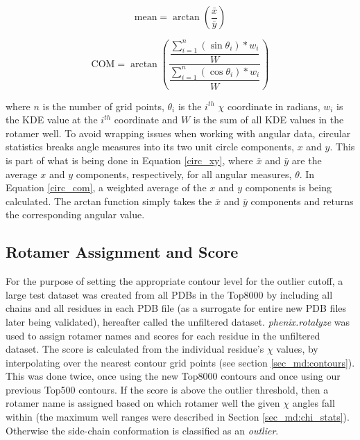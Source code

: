 \begin{equation}
\textrm{mean} = \arctan\left (
\frac{\bar{x}}{\bar{y}}
\right )
\label{circ_m}
\end{equation}

\begin{equation}
\textrm{COM} = \arctan\left (
  \dfrac{
    \dfrac{\sum_{i=1}^{n}\left ( \sin \theta_{i} \right )\ast w_{i}}{W}
  }{
    \dfrac{\sum_{i=1}^{n} \left ( \cos \theta_{i} \right )\ast w_{i}}{W}
  }
\right )
\label{circ_com}
\end{equation}

\noindent where $n$ is the number of grid points, $\theta_{i}$ is the $i^{th}$ $\chi$ coordinate in radians, $w_{i}$ is the KDE value at the $i^{th}$ coordinate and $W$ is the sum of all KDE values in the rotamer well. To avoid wrapping issues when working with angular data, circular statistics breaks angle measures into its two unit circle components, $x$ and $y$. This is part of what is being done in Equation \ref{circ_xy}, where $\bar{x}$ and $\bar{y}$ are the average $x$ and $y$ components, respectively, for all angular measures, $\theta$. In Equation \ref{circ_com}, a weighted average of the $x$ and $y$ components is being calculated. The arctan function simply takes the $\bar{x}$ and $\bar{y}$ components and returns the corresponding angular value.

\subsection{Rotamer Assignment and Score}
\label{sec_md:rotaassign}
For the purpose of setting the appropriate contour level for the outlier cutoff, a large test dataset was created from all PDBs in the Top8000 by including all chains and all residues in each PDB file (as a surrogate for entire new PDB files later being validated), hereafter called the unfiltered dataset. \textit{phenix.rotalyze} was used to assign rotamer names and scores for each residue in the unfiltered dataset. The score is calculated from the individual residue's $\chi$ values, by interpolating over the nearest contour grid points (see section \ref{sec_md:contours}). This was done twice, once using the new Top8000 contours and once using our previous Top500 contours. If the score is above the outlier threshold, then a rotamer name is assigned based on which rotamer well the given $\chi$ angles fall within (the maximum well ranges were described in Section \ref{sec_md:chi_stats}). Otherwise the side-chain conformation is classified as an \textit{outlier}.